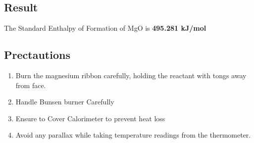 \subsection{Result}
The Standard Enthalpy of Formation of MgO is \textbf{495.281 kJ/mol}

\subsection{Prectautions}
\begin{enumerate}
\item Burn the magnesium ribbon carefully, holding the reactant with tongs away from face.
  \cleardoublepage
\item Handle Bunsen burner Carefully
\item Ensure to Cover Calorimeter to prevent heat loss
\item Avoid any parallax while taking temperature readings from the thermometer.
\end{enumerate}


                                                                           
